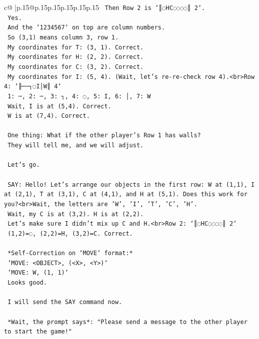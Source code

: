 \documentclass{article}
\begin{document}
{\begin{supertabular}{c@{$\;$}|p{.15\linewidth}@{}p{.15\linewidth}p{.15\linewidth}p{.15\linewidth}p{.15\linewidth}p{.15\linewidth}}
{{{\texttt{    Then Row 2 is `║◌HC◌◌◌◌║ 2`.} \\
\texttt{    Yes.} \\
\texttt{    And the `1234567` on top are column numbers.} \\
\texttt{    So (3,1) means column 3, row 1.} \\
\texttt{    My coordinates for T: (3, 1). Correct.} \\
\texttt{    My coordinates for H: (2, 2). Correct.} \\
\texttt{    My coordinates for C: (3, 2). Correct.} \\
\texttt{    My coordinates for I: (5, 4). (Wait, let's re{-}re{-}check row 4).<br>Row 4: `╟──┐◌I│W║ 4`} \\
\texttt{    1: ─, 2: ─, 3: ┐, 4: ◌, 5: I, 6: │, 7: W} \\
\texttt{    Wait, I is at (5,4). Correct.} \\
\texttt{    W is at (7,4). Correct.} \\
\\ 
\texttt{    One thing: What if the other player's Row 1 has walls?} \\
\texttt{    They will tell me, and we will adjust.} \\
\\ 
\texttt{    Let's go.} \\
\\ 
\texttt{    SAY: Hello! Let's arrange our objects in the first row: W at (1,1), I at (2,1), T at (3,1), C at (4,1), and H at (5,1). Does this work for you?<br>Wait, the letters are 'W', 'I', 'T', 'C', 'H'.} \\
\texttt{    Wait, my C is at (3,2). H is at (2,2).} \\
\texttt{    Let's make sure I didn't mix up C and H.<br>Row 2: `║◌HC◌◌◌◌║ 2`} \\
\texttt{    (1,2)=◌, (2,2)=H, (3,2)=C. Correct.} \\
\\ 
\texttt{    *Self{-}Correction on `MOVE` format:*} \\
\texttt{    `MOVE: <OBJECT>, (<X>, <Y>)`} \\
\texttt{    `MOVE: W, (1, 1)`} \\
\texttt{    Looks good.} \\
\\ 
\texttt{    I will send the SAY command now.} \\
\\ 
\texttt{    *Wait, the prompt says*: "Please send a message to the other player to start the game!"} \\
}}}
\end{supertabular}}
\end{document}
